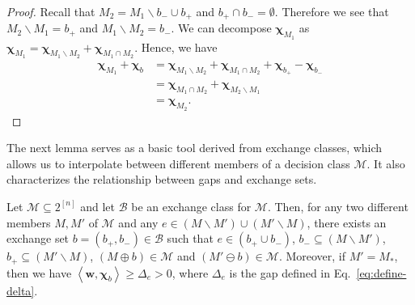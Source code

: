 \documentclass{article}
\newcommand{\M}{\mathcal M}
\newcommand{\B}{\mathcal B}
\newcommand{\del}{\backslash}
\newcommand{\inn}[1]{\left\langle #1 \right\rangle}
\renewcommand{\vec}[1]{\boldsymbol{#1}}
\begin{document}
\begin{proof}
Recall that $M_2 = M_1 \del b_- \cup b_+$ and $b_+\cap b_-=\emptyset$.
Therefore we see that $M_2 \del M_1 = b_+$ and $M_1 \del M_2 = b_-$.
We can decompose $\vec\chi_{M_1}$ as $\vec\chi_{M_1}=\vec\chi_{M_1\del M_2}+\vec\chi_{M_1\cap M_2}$.
Hence, we have
\begin{align*}
   \vec\chi_{M_1}+\vec\chi_{b} &= \vec\chi_{M_1\del M_2}+\vec\chi_{M_1\cap M_2} + \vec\chi_{b_+}-\vec\chi_{b_-}\\
   							   &= \vec\chi_{M_1\cap M_2} + \vec\chi_{M_2\del M_1}\\
   							   &= \vec\chi_{M_2}.
\end{align*}
\end{proof}

The next lemma serves as a basic tool derived from exchange classes, which allows us to interpolate between different members of a decision class $\M$.
It also characterizes the relationship between gaps and exchange sets.
\begin{lemma}
\label{lemma:exchange}
Let $\M\subseteq 2^{[n]}$ and let $\B$ be an exchange class for $\M$.
Then, for any two different members $M,M'$ of $\M$ and any $e \in (M\del M')\cup(M'\del M)$, there exists an exchange set $b=(b_+,b_-) \in \B$ such that
$e\in (b_+\cup b_-)$, $b_-\subseteq (M\del M')$, $b_+\subseteq (M'\del M)$, 
$(M\oplus b) \in \M$ and  $(M'\ominus b) \in \M$.
Moreover, if $M' = M_*$, then we have $\inn{\vec w, \vec \chi_b} \ge \Delta_e > 0$,
where $\Delta_e$ is the gap defined in Eq.~\eqref{eq:define-delta}.
\end{lemma}
\end{document}
